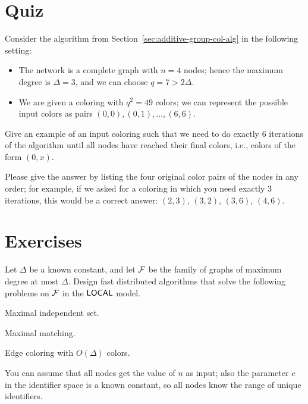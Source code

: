 \section{Quiz}

Consider the algorithm from Section~\ref{sec:additive-group-col-alg} in the following setting:
\begin{itemize}[noitemsep]
    \item The network is a complete graph with $n = 4$ nodes; hence the maximum degree is $\Delta = 3$, and we can choose $q = 7 > 2\Delta$.
    \item We are given a coloring with $q^2 = 49$ colors; we can represent the possible input colors as pairs $(0,0),\allowbreak (0,1),\allowbreak \dotsc,\allowbreak (6,6)$.
\end{itemize}
Give an example of an input coloring such that we need to do exactly $6$ iterations of the algorithm until all nodes have reached their final colors, i.e., colors of the form $(0,x)$.

Please give the answer by listing the four original color pairs of the nodes in any order; for example, if we asked for a coloring in which you need exactly 3 iterations, this would be a correct answer: $(2, 3)$, $(3, 2)$, $(3, 6)$, $(4, 6)$.

\section{Exercises}

\begin{ex}[applications]
    Let $\Delta$ be a known constant, and let $\mathcal{F}$ be the family of graphs of maximum degree at most $\Delta$. Design fast distributed algorithms that solve the following problems on $\mathcal{F}$ in the $\textup{\sffamily LOCAL}$ model.
    \begin{subex}
        \item Maximal independent set.
        \item Maximal matching.
        \item Edge coloring with $O(\Delta)$ colors.
    \end{subex}
    You can assume that all nodes get the value of $n$ as input; also the parameter $c$ in the identifier space is a known constant, so all nodes know the range of unique identifiers.
\end{ex}

